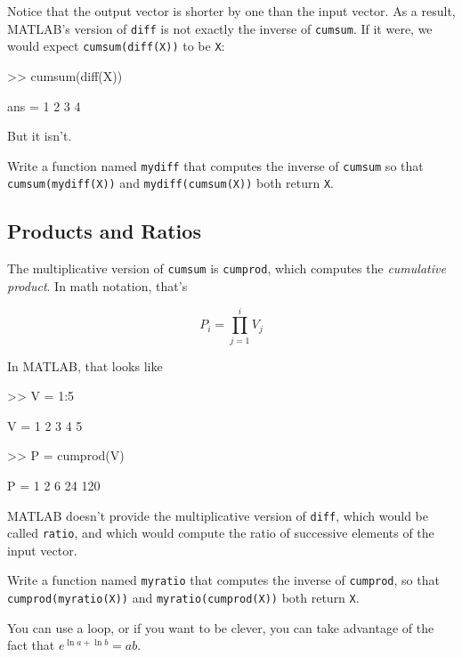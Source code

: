 Notice that the output vector is shorter by one than the input
vector.  As a result, MATLAB's version of \lstinline{diff} is not
exactly the inverse of \lstinline{cumsum}.  If it were, we would
expect \lstinline{cumsum(diff(X))} to be \lstinline{X}:

\begin{code}
>> cumsum(diff(X))

ans = 1     2     3     4
\end{code}

But it isn't.

\begin{ex}
Write a function named \lstinline{mydiff} that computes the
inverse of \lstinline{cumsum} so that \lstinline{cumsum(mydiff(X))} and
\lstinline{mydiff(cumsum(X))} both return \lstinline{X}.

\end{ex}


\subsection{Products and Ratios}

The multiplicative version of \lstinline{cumsum} is \lstinline{cumprod},
which computes the \emph{cumulative product}.  In math notation,
that's


\begin{equation*}
P_i = \prod_{j=1}^i V_j
\end{equation*}

In MATLAB, that looks like

\begin{code}
>> V = 1:5

V = 1     2     3     4     5

>> P = cumprod(V)

P = 1     2     6    24   120
\end{code}

MATLAB doesn't provide the multiplicative version
of \lstinline{diff}, which would be called \lstinline{ratio}, and which would
compute the ratio of successive elements of the input vector.

\begin{ex}
Write a function named \lstinline{myratio} that computes the
inverse of \lstinline{cumprod}, so that \lstinline{cumprod(myratio(X))} and
\lstinline{myratio(cumprod(X))} both
return \lstinline{X}.

You can use a loop, or if you want to be clever, you can take
advantage of the fact that $e^{\ln a + \ln b} = a b$.


\end{ex}


